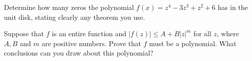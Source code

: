 \begin{alist}
\item Determine how many zeros the polynomial $f(x)=z^4-3z^3+z^2+6$ 
has in the unit disk, stating clearly any theorem you use.
\item Suppose that $f$ is an entire function and $|f(z)|\leq A+B|z|^m$
for all $z$, where $A,B$ and $m$ are positive numbers. Prove that $f$
must be a polynomial. What conclusions can you draw about this
polynomial?
\end{alist}
